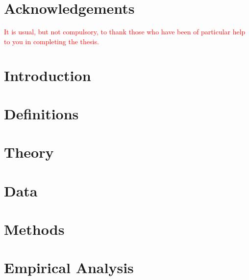 \documentclass[12pt,twoside]{report}
\begin{document}

    


    \chapter*{Acknowledgements}
    \textcolor{red}{It is usual, but not compulsory, to thank those who have been of particular help to you in completing the thesis.}

    {\hypersetup{linkcolor=black}
        \tableofcontents
        \listoffigures
        \listoftables
    }
        {\hypersetup{linkcolor=mycolor}}
    
    \chapter{Introduction} 
    
    
    \chapter{Definitions}
    
    \chapter{Theory}
    
    
    \chapter{Data}
    
    
    \chapter{Methods}
    
    
    \chapter{Empirical Analysis}
    
    
\end{document}
